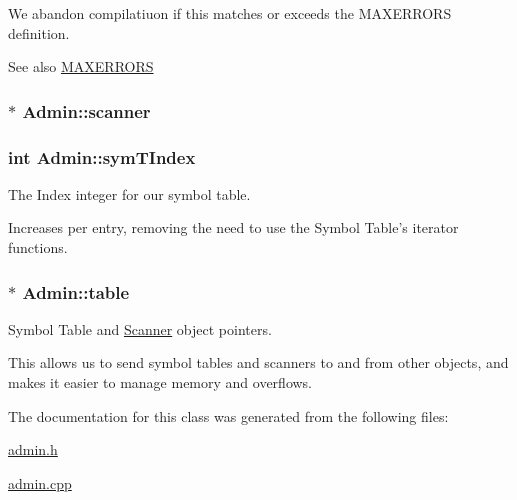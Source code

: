 We abandon compilatiuon if this matches or exceeds the MAXERRORS definition. \begin{DoxySeeAlso}{See also}
\hyperlink{admin_8h_abfea00ff3da8375f9fdd7a6608632e42}{MAXERRORS} 
\end{DoxySeeAlso}
\hypertarget{classAdmin_a6846c5ec5e565001a18a20167ff7b3cf}{
\subsubsection[{scanner}]{$\ast$ {\bf Admin::scanner}}}
\label{classAdmin_a6846c5ec5e565001a18a20167ff7b3cf}
\hypertarget{classAdmin_ae1c48226f950c3e470785785aff4d536}{
\subsubsection[{symTIndex}]{\setlength{\rightskip}{0pt plus 5cm}int {\bf Admin::symTIndex}}}
\label{classAdmin_ae1c48226f950c3e470785785aff4d536}


The Index integer for our symbol table. 

Increases per entry, removing the need to use the Symbol Table's iterator functions. \hypertarget{classAdmin_afb5161f047f166b985257447b9c47f22}{
\subsubsection[{table}]{$\ast$ {\bf Admin::table}}}
\label{classAdmin_afb5161f047f166b985257447b9c47f22}


Symbol Table and \hyperlink{classScanner}{Scanner} object pointers. 

This allows us to send symbol tables and scanners to and from other objects, and makes it easier to manage memory and overflows. 

The documentation for this class was generated from the following files:\begin{DoxyCompactItemize}
\item 
\hyperlink{admin_8h}{admin.h}\item 
\hyperlink{admin_8cpp}{admin.cpp}\end{DoxyCompactItemize}
